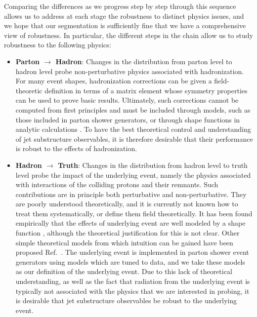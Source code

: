 \documentclass[11pt]{cernrep}
\begin{document}
Comparing the differences as we progress step by step through this sequence allows us to address at each stage the robustness to distinct physics issues, and we hope that our segmentation is sufficiently fine that we have a comprehensive view of robustness.
%
In particular, the different steps in the chain allow us to study robustness to the following physics: 
%
\begin{itemize}
%
\item {\bf Parton $\to$ Hadron}: Changes in the distribution from parton
  level to hadron level probe non-perturbative physics associated with
  hadronization.
  For many event shapes, hadronization corrections can
  be given a field-theoretic definition in terms of a matrix element
  whose symmetry properties can be used to prove basic
  results.
  Ultimately, such corrections cannot be computed
  from first principles and must be included through models, such as
  those included in parton shower generators, or through shape
  functions in analytic calculations
  \cite{Dokshitzer:1995qm,Dokshitzer:1995zt,Korchemsky:1999kt,Korchemsky:2000kp,Bosch:2004th,Hoang:2007vb,Ligeti:2008ac}.
    To have the best theoretical
  control and understanding of jet substructure observables, it is
  therefore desirable that their performance is robust to the effects
  of hadronization.
\item {\bf Hadron $\to$ Truth}: Changes in the distribution from hadron level to truth level probe the impact of the underlying event, namely the physics associated with interactions of the colliding protons and their remnants.
%
Such contributions are in principle both perturbative and non-perturbative.
%
They are poorly understood theoretically, and it is currently not known how to treat them systematically, or define them field theoretically.
%
It has been found empirically that the effects of underlying event are well modeled by a shape function \cite{Stewart:2014nna}, although the theoretical justification for this is not clear. Other simple theoretical models from which intuition can be gained have been proposed Ref.~\cite{Cacciari:2009dp}.
%
The underlying event is implemented in parton shower event generators using models which are tuned to data, and we take these models as our definition of the underlying event.
%
Due to this lack of theoretical understanding, as well as the fact that radiation from the underlying event is typically not associated with the physics that we are interested in probing, it is desirable that jet substructure observables be robust to the underlying event.

\end{itemize}
\end{document}

